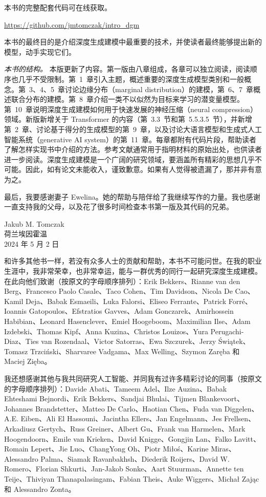 本书的完整配套代码可在线获取。
\begin{center}
\url{https://github.com/jmtomczak/intro_dgm}
\end{center}

本书的最终目的是介绍深度生成建模中最重要的技术，并使读者最终能够提出新的模型，动手实现它们。

\emph{本书的结构。} 本版更新了内容。第一版由八章组成，各章可以独立阅读，阅读顺序也几乎不受限制。第~1~章引入主题，概述重要的深度生成模型类别和一般概念。第~3、4、5~章讨论边缘分布（marginal distribution）的建模，第~6、7~章概述联合分布的建模。第~8~章介绍一类不以似然为目标来学习的潜变量模型。第~10~章说明深度生成建模如何用于快速发展的神经压缩（neural compression）领域。新版新增关于 Transformer 的内容（第~3.3~节和第~5.5.3.5~节），并新增第~2~章、讨论基于得分的生成模型的第~9~章，以及讨论大语言模型和生成式人工智能系统（generative AI system）的第~11~章。每章都附有代码片段，帮助读者了解怎样实现书中介绍的方法。参考文献通常用于指明材料的原始出处，也供读者进一步阅读。深度生成建模是一个广阔的研究领域，要涵盖所有精彩的思想几乎不可能。因此，如有论文未能收入，谨致歉意。如果有人觉得被遗漏了，那并非有意为之。

最后，我要感谢妻子 Ewelina。她的帮助与陪伴给了我继续写作的力量。我也感谢一直支持我的父母，以及花了很多时间检查本书第一版及其代码的兄弟。

\begin{flushright}
Jakub M. Tomczak\\
荷兰埃因霍温\\
2024 年 5 月 2 日
\end{flushright}

和许多其他书一样，若没有众多人士的贡献和帮助，本书不可能问世。在我的职业生涯中，我非常荣幸，也非常幸运，能与一群优秀的同行一起研究深度生成建模。在此向他们致谢（按原文的字母顺序排列）：Erik Bekkers、Rianne van den Berg、Francesco Paolo Casale、Taco Cohen、Tim Davidson、Nicola De Cao、Kamil Deja、Babak Esmaeili、Luka Falorsi、Eliseo Ferrante、Patrick Forré、Ioannis Gatopoulos、Efstratios Gavves、Adam Gonczarek、Amirhossein Habibian、Leonard Hasenclever、Emiel Hoogeboom、Maximilian Ilse、Adam Izdebski、Thomas Kipf、Anna Kuzina、Christos Louizos、Yura Perugachi-Diaz、Ties van Rozendaal、Victor Satorras、Ewa Szczurek、Jerzy Świątek、Tomasz Trzciński、Sharvaree Vadgama、Max Welling、Szymon Zaręba 和 Maciej Zięba。

我还想感谢其他与我共同研究人工智能、并同我有过许多精彩讨论的同事（按原文的字母顺序排列）：Davide Abati、Tameem Adel、Ilze Auzina、Babak Ehteshami Bejnordi、Erik Bekkers、Sandjai Bhulai、Tijmen Blankevoort、Johannes Brandstetter、Matteo De Carlo、Haotian Chen、Fuda van Diggelen、A.E. Eiben、Ali El Hassouni、Jacintha Ellers、Jan Engelmann、Jes Frellsen、Arkadiusz Gertych、Russ Greiner、Albert Gu、Frank van Harmelen、Mark Hoogendoorn、Emile van Krieken、David Knigge、Gongjin Lan、Falko Lavitt、Romain Lepert、Jie Luo、ChangYong Oh、Piotr Miłoś、Karine Miras、Alessandro Palma、Siamak Ravanbakhsh、Diederik Roijers、David W. Romero、Florian Shkurti、Jan-Jakob Sonke、Aart Stuurman、Annette ten Teije、Thiviyan Thanapalasingam、Fabian Theis、Auke Wiggers、Michał Zając 和 Alessandro Zonta。

